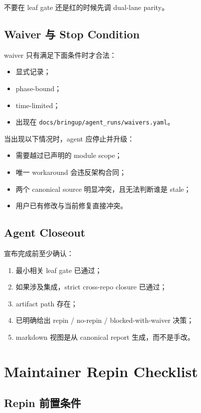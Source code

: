 \documentclass[UTF8,11pt,a4paper]{ctexart}
\begin{document}
不要在 leaf gate 还是红的时候先调 dual-lane parity。

\subsection{Waiver 与 Stop Condition}

waiver 只有满足下面条件时才合法：

\begin{itemize}
  \item 显式记录；
  \item phase-bound；
  \item time-limited；
  \item 出现在 \texttt{docs/bringup/agent\_runs/waivers.yaml}。
\end{itemize}

当出现以下情况时，agent 应停止并升级：

\begin{itemize}
  \item 需要越过已声明的 module scope；
  \item 唯一 workaround 会违反架构合同；
  \item 两个 canonical source 明显冲突，且无法判断谁是 stale；
  \item 用户已有修改与当前修复直接冲突。
\end{itemize}

\subsection{Agent Closeout}

宣布完成前至少确认：

\begin{enumerate}
  \item 最小相关 leaf gate 已通过；
  \item 如果涉及集成，strict cross-repo closure 已通过；
  \item artifact path 存在；
  \item 已明确给出 repin / no-repin / blocked-with-waiver 决策；
  \item markdown 视图是从 canonical report 生成，而不是手改。
\end{enumerate}

\section{Maintainer Repin Checklist}

\subsection{Repin 前置条件}
\end{document}
